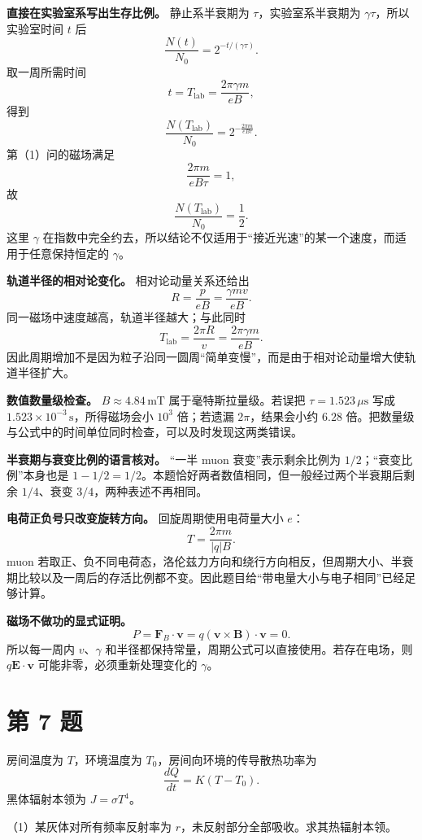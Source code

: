 \documentclass[12pt,a4paper,UTF8]{ctexart}
\begin{document}
\textbf{直接在实验室系写出生存比例。} 静止系半衰期为
\(\tau\)，实验室系半衰期为 \(\gamma\tau\)，所以实验室时间 \(t\) 后 \[
\frac{N(t)}{N_0}
=2^{-t/(\gamma\tau)}.
\] 取一周所需时间 \[
t=T_{\mathrm{lab}}
=\frac{2\pi\gamma m}{eB},
\] 得到 \[
\frac{N(T_{\mathrm{lab}})}{N_0}
=2^{-\frac{2\pi m}{eB\tau}}.
\] 第（1）问的磁场满足 \[
\frac{2\pi m}{eB\tau}=1,
\] 故 \[
\frac{N(T_{\mathrm{lab}})}{N_0}=\frac12.
\] 这里 \(\gamma\)
在指数中完全约去，所以结论不仅适用于``接近光速''的某一个速度，而适用于任意保持恒定的
\(\gamma\)。

\textbf{轨道半径的相对论变化。} 相对论动量关系还给出 \[
R=\frac{p}{eB}
=\frac{\gamma mv}{eB}.
\] 同一磁场中速度越高，轨道半径越大；与此同时 \[
T_{\mathrm{lab}}=\frac{2\pi R}{v}
=\frac{2\pi\gamma m}{eB}.
\]
因此周期增加不是因为粒子沿同一圆周``简单变慢''，而是由于相对论动量增大使轨道半径扩大。

\textbf{数值数量级检查。} \(B\approx4.84\,\mathrm{mT}\)
属于毫特斯拉量级。若误把 \(\tau=1.523\,\mu\mathrm s\) 写成
\(1.523\times10^{-3}\,\mathrm s\)，所得磁场会小 \(10^3\) 倍；若遗漏
\(2\pi\)，结果会小约 \(6.28\)
倍。把数量级与公式中的时间单位同时检查，可以及时发现这两类错误。

\textbf{半衰期与衰变比例的语言核对。} ``一半 muon 衰变''表示剩余比例为
\(1/2\)；``衰变比例''本身也是
\(1-1/2=1/2\)。本题恰好两者数值相同，但一般经过两个半衰期后剩余
\(1/4\)、衰变 \(3/4\)，两种表述不再相同。

\textbf{电荷正负号只改变旋转方向。} 回旋周期使用电荷量大小 \(e\)： \[
T=\frac{2\pi m}{|q|B}.
\] muon
若取正、负不同电荷态，洛伦兹力方向和绕行方向相反，但周期大小、半衰期比较以及一周后的存活比例都不变。因此题目给``带电量大小与电子相同''已经足够计算。

\textbf{磁场不做功的显式证明。} \[
P=\boldsymbol F_B\cdot\boldsymbol v
=q(\boldsymbol v\times\boldsymbol B)\cdot\boldsymbol v=0.
\] 所以每一周内 \(v\)、\(\gamma\)
和半径都保持常量，周期公式可以直接使用。若存在电场，则
\(q\boldsymbol E\cdot\boldsymbol v\) 可能非零，必须重新处理变化的
\(\gamma\)。

\newpage

\section{第 7 题}\label{ux7b2c-7-ux9898}

房间温度为 \(T\)，环境温度为 \(T_0\)，房间向环境的传导散热功率为 \[
\frac{dQ}{dt}=K(T-T_0).
\] 黑体辐射本领为 \(J=\sigma T^4\)。

（1）某灰体对所有频率反射率为
\(r\)，未反射部分全部吸收。求其热辐射本领。
\end{document}
